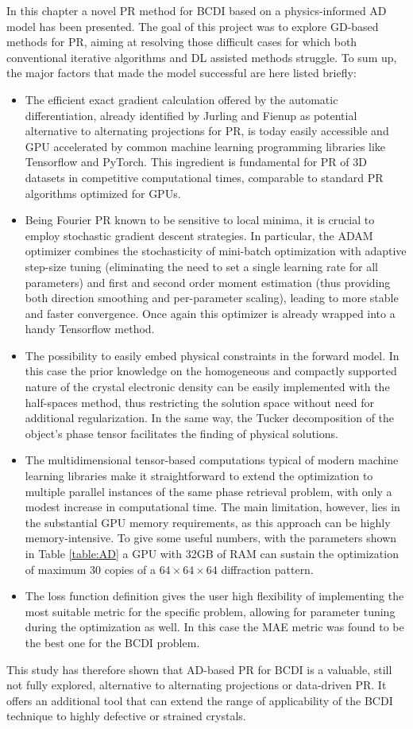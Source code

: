 In this chapter a novel PR method for BCDI based on a physics-informed AD model has been presented. The goal of this 
project was to explore GD-based methods for PR, aiming at resolving those difficult cases for which both conventional 
iterative algorithms and DL assisted methods struggle. To sum up, 
the major factors that made the model successful are here listed briefly: 
\begin{itemize}

  \item The efficient exact gradient calculation offered by the automatic differentiation, already identified by Jurling and 
  Fienup as potential alternative to alternating projections for PR, is today easily accessible and GPU accelerated by common 
  machine learning programming libraries like Tensorflow and PyTorch. This ingredient is fundamental for PR of 3D datasets 
  in competitive computational times, comparable to standard PR algorithms optimized for GPUs. 

  \item Being Fourier PR known to be sensitive to local minima, it is crucial to employ stochastic gradient descent 
  strategies. In particular, the ADAM optimizer combines the stochasticity of mini-batch optimization with adaptive 
  step-size tuning (eliminating the need to set a single learning rate for all parameters) and first and second order 
  moment estimation (thus providing both direction smoothing and per-parameter scaling), leading to more stable and 
  faster convergence. Once again this optimizer is already wrapped into a handy Tensorflow method. 

  \item The possibility to easily embed physical constraints in the forward model. In this case the prior knowledge on the 
  homogeneous and compactly supported nature of the crystal electronic density can be easily implemented with the half-spaces 
  method, thus restricting the solution space without need for additional regularization. In the same way, the Tucker 
  decomposition of the object's phase tensor facilitates the finding of physical solutions. 

  \item The multidimensional tensor-based computations typical of modern machine learning libraries make it straightforward 
  to extend the optimization to multiple parallel instances of the same phase retrieval problem, with only a modest 
  increase in computational time. The main limitation, however, lies in the substantial GPU memory requirements, as 
  this approach can be highly memory-intensive. To give some useful numbers, with the parameters shown in Table \ref{table:AD} 
  a GPU with 32GB of RAM can sustain the optimization of maximum 30 copies of a $64\times 64\times 64$ diffraction pattern. 

  \item The loss function definition gives the user high flexibility of implementing the most suitable metric for the 
  specific problem, allowing for parameter tuning during the optimization as well. In this case the MAE metric was found to be the 
  best one for the BCDI problem.  
  
\end{itemize}

This study has therefore shown that AD-based PR for BCDI is a valuable, still not fully explored, alternative to alternating 
projections or data-driven PR. It offers an additional tool that can extend the range of applicability of the BCDI technique to highly defective or strained 
crystals. 

